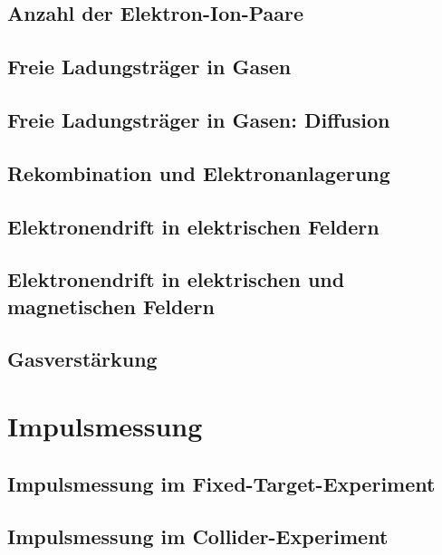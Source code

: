 \documentclass{article}
\begin{document}
	\subsection{Anzahl der Elektron-Ion-Paare}
		
	\subsection{Freie Ladungsträger in Gasen}
		
	\subsection{Freie Ladungsträger in Gasen: Diffusion}
		
	\subsection{Rekombination und Elektronanlagerung}
		
	\subsection{Elektronendrift in elektrischen Feldern}
		
	\subsection{Elektronendrift in elektrischen und magnetischen Feldern}
		
	\subsection{Gasverstärkung}
		
				
\section{Impulsmessung}
\graphicspath{{bilder/4/}}

	\subsection{Impulsmessung im Fixed-Target-Experiment}
		
	\subsection{Impulsmessung im Collider-Experiment}
			
				
\end{document}

